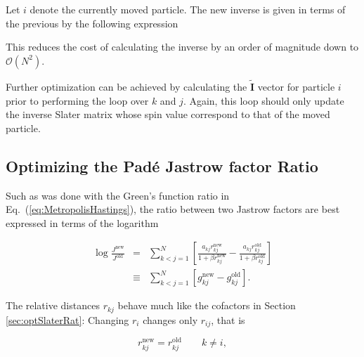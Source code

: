 Let $i$ denote the currently moved particle. The new inverse is given in terms of the previous by the following expression \cite{abInitioMC, morten}


This reduces the cost of calculating the inverse by an order of magnitude down to $\mathcal{O}(N^2)$.

Further optimization can be achieved by calculating the $\mathbf{\tilde I}$ vector for particle $i$ prior to performing the loop over $k$ and $j$. Again, this loop should only update the inverse Slater matrix whose spin value correspond to that of the moved particle.

\subsection{Optimizing the Padé Jastrow factor Ratio}
\label{sec:optPagejastRat}

Such as was done with the Green's function ratio in Eq.~(\ref{eq:MetropolisHastings}), the ratio between two Jastrow factors are best expressed in terms of the logarithm

\begin{eqnarray}
 \log \frac{J^\mathrm{new}}{J^\mathrm{old}} &=& \sum_{k<j = 1}^N \left[\frac{a_{kj}r^\mathrm{new}_{kj}}{1 + \beta r^\mathrm{new}_{kj}} - \frac{a_{kj}r^\mathrm{old}_{kj}}{1 + \beta r^\mathrm{old}_{kj}}\right] \\
                      &\equiv& \sum_{k<j = 1}^N \left[g^\mathrm{new}_{kj} - g^\mathrm{old}_{kj}\right]. \label{eq:jastrowRatSTD}
\end{eqnarray}

The relative distances $r_{kj}$ behave much like the cofactors in Section \ref{sec:optSlaterRat}: Changing $r_i$ changes only $r_{ij}$, that is

\begin{equation}
 r^\mathrm{new}_{kj} = r^\mathrm{old}_{kj} \qquad k \ne i, 
\end{equation}

